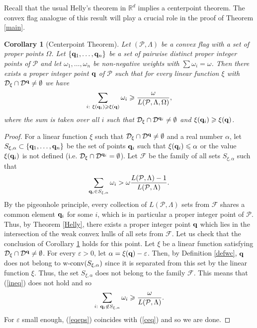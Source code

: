 \documentclass{daj}
\renewcommand{\le}{\leqslant}
\renewcommand{\ge}{\geqslant}
\newcommand{\R}{\mathbb R}
\newcommand{\F}{\mathcal F}
\newcommand{\D}{\mathcal D}
\renewcommand{\P}{\mathcal P}
\newcommand{\wc}{\mbox{\rm w-conv}}
\newtheorem{cor}[theorem]{Corollary}
\theoremstyle{definition}
\theoremstyle{remark}
\theoremstyle{definition}
\theoremstyle{definition}
\begin{document}
Recall that the usual Helly's theorem in $\R^d$ implies a centerpoint theorem. The convex flag analogue of this result will play a crucial role in the proof of Theorem \ref{main}.

\begin{cor}[Centerpoint Theorem]\label{central}
Let $(\P, \Lambda)$ be a convex flag with a set of proper points $\Omega$. Let $\{{\bf q}_1, \ldots, {\bf q}_n\}$ be a set of pairwise distinct proper integer points of $\P$ and let $\omega_1, \ldots, \omega_n$ be non-negative weights with $\sum \omega_i = \omega$. 
Then there exists a proper integer point $\bf q$ of $\P$ such that for every linear function $\xi$ with $\D_\xi \cap \D^{\bf q} \neq \emptyset$ we have
\begin{equation}\label{ceq}
\sum_{i: ~\xi({\bf q}_i) \ge \xi ({\bf q})} \omega_i \ge \frac{\omega}{L(\P, \Lambda, \Omega)},
\end{equation}
where the sum is taken over all $i$ such that $\D_{\xi} \cap \D^{{\bf q}_i}\neq \emptyset$ and $\xi ({\bf q}_i) \ge \xi ({\bf q})$.
\end{cor}

\begin{proof}
For a linear function $\xi$ such that $\D_\xi \cap \D^{\bf q} \neq \emptyset$ and a real number $\alpha$, let $S_{\xi, \alpha} \subset \{{\bf q}_1, \ldots, {\bf q}_n\}$ be the set of points ${\bf q}_i$ such that $\xi ({\bf q}_i) \le \alpha$ or the value $\xi ({\bf q}_i)$ is not defined (i.e. $\D_\xi \cap \D^{{\bf q}_i} = \emptyset$). Let $\F$ be the family of all sets $S_{\xi, \alpha}$ such that
\begin{equation}\label{ineq}
\sum_{{\bf q}_i \in S_{\xi, \alpha}} \omega_i > \omega \frac{L(\P, \Lambda)-1}{L(\P, \Lambda)}.
\end{equation}
By the pigeonhole principle, every collection of $L(\P, \Lambda)$ sets from $\F$ shares a common element ${\bf q}_i$ for some $i$, which is in particular a proper integer point of $\P$. Thus, by Theorem \ref{Helly}, there exists a proper integer point ${\bf q}$ which lies in the intersection of the weak convex hulls of all sets from $\F$. Let us check that the conclusion of Corollary \ref{central} holds for this point.
Let $\xi$ be a linear function satisfying $\D_{\xi} \cap \D^{{\bf q}}\neq \emptyset$. For every $\varepsilon > 0$, let $\alpha = \xi({\bf q}) -\varepsilon$. Then, by Definition \ref{defwc}, ${\bf q}$ does not belong to $\wc(S_{\xi, \alpha})$ since it is separated from this set by the linear function $\xi$. Thus, the set $S_{\xi, \alpha}$ does not belong to the family $\mathcal F$. This means that (\ref{ineq}) does not hold and so \begin{equation}\label{eqeps}
    \sum_{i:~ {\bf q}_i \not \in S_{\xi, \alpha}} \omega_i \ge \frac{\omega}{L(\P, \Lambda)}.
\end{equation}
For $\varepsilon$ small enough, (\ref{eqeps}) coincides with (\ref{ceq}) and so we are done.
\end{proof}
\end{document}
